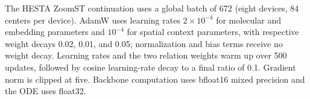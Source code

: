 The HESTA ZoomST continuation uses a global batch of 672 (eight devices, 84 centers per device). AdamW uses learning rates $2\times10^{-4}$ for molecular and embedding parameters and $10^{-4}$ for spatial context parameters, with respective weight decays 0.02, 0.01, and 0.05; normalization and bias terms receive no weight decay. Learning rates and the two relation weights warm up over 500 updates, followed by cosine learning-rate decay to a final ratio of 0.1. Gradient norm is clipped at five. Backbone computation uses bfloat16 mixed precision and the ODE uses float32.
